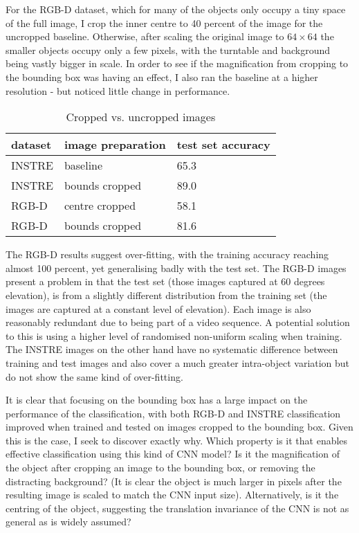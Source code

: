 For the RGB-D dataset, which for many of the objects only occupy a tiny space of the full image, I crop the inner centre to 40 percent of the image for the uncropped baseline. Otherwise, after scaling the original image to $ 64 \times 64 $ the smaller objects occupy only a few pixels, with the turntable and background being vastly bigger in scale. In order to see if the magnification from cropping to the bounding box was having an effect, I also ran the baseline at a higher resolution - but noticed little change in performance.


\begin{table}[h]
  \centering
    \caption{Cropped vs. uncropped images }
    
  \begin{tabular}{ l l l }
    
    dataset & image preparation & test set accuracy \\
    \toprule
    
    INSTRE & baseline &  65.3 \\
    INSTRE & bounds cropped & 89.0 \\
    
    RGB-D & centre cropped & 58.1 \\
    RGB-D & bounds cropped & 81.6 \\
    
    \bottomrule
  \end{tabular}
\label{fig:focus_crop}
\end{table}

The RGB-D results suggest over-fitting, with the training accuracy reaching almost 100 percent, yet generalising badly with the test set. The RGB-D images present a problem in that the test set (those images captured at 60 degrees elevation), is from a slightly different distribution from the training set (the images are captured at a constant level of elevation). Each image is also reasonably redundant due to being part of a video sequence. A potential solution to this is using a higher level of randomised non-uniform scaling when training. The INSTRE images on the other hand have no systematic difference between training and test images and also cover a much greater intra-object variation but do not show the same kind of over-fitting.

It is clear that focusing on the bounding box has a large impact on the performance of the classification, with both RGB-D and INSTRE classification improved when trained and tested on images cropped to the bounding box. Given this is the case, I seek to discover exactly why. Which property is it that enables effective classification using this kind of CNN model? Is it the magnification of the object after cropping an image to the bounding box, or removing the distracting background? (It is clear the object is much larger in pixels after the resulting image is scaled to match the CNN input size). Alternatively, is it the centring of the object, suggesting the translation invariance of the CNN is not as general as is widely assumed?



